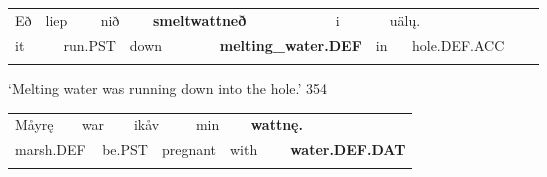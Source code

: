 \begin{listWWNumxxvileveli}
\item {}

\end{listWWNumxxvileveli}

\begin{tabular}{llllllllllllll}
\lsptoprule
Eð & \multicolumn{2}{l}{liep

} & \multicolumn{2}{l}{nið

} & \multicolumn{2}{l}{{\bfseries smeltwattneð}

} & \multicolumn{2}{l}{i

} & \multicolumn{2}{l}{uäl\k{u}.

} & \multicolumn{2}{l}{} & \\
\multicolumn{2}{l}{it

} & \multicolumn{2}{l}{run.PST

} & \multicolumn{2}{l}{down

} & \multicolumn{2}{l}{{\bfseries melting\_water.DEF}

} & \multicolumn{2}{l}{in

} & \multicolumn{2}{l}{hole.DEF.ACC

} & \multicolumn{2}{l}{}\\
\lspbottomrule
\end{tabular}

\begin{styleTranslation}
‘Melting water was running down into the hole.’ 354

\end{styleTranslation}

\begin{tabular}{llllllllll}
\lsptoprule
Måyrę & \multicolumn{2}{l}{war

} & \multicolumn{2}{l}{ikåv

} & \multicolumn{2}{l}{min

} & \multicolumn{2}{l}{{\bfseries wattnę.}

} & \\
\multicolumn{2}{l}{marsh.DEF

} & \multicolumn{2}{l}{be.PST

} & \multicolumn{2}{l}{pregnant

} & \multicolumn{2}{l}{with

} & \multicolumn{2}{l}{{\bfseries water.DEF.DAT}

}\\
\lspbottomrule
\end{tabular}

